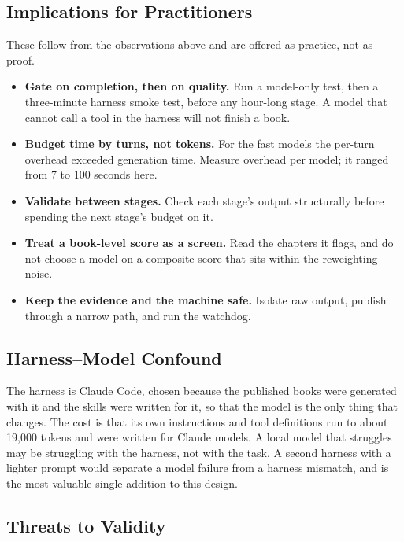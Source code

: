 \subsection{Implications for Practitioners}

These follow from the observations above and are offered as practice, not as proof.

\begin{itemize}
\item \textbf{Gate on completion, then on quality.} Run a model-only test, then a three-minute harness smoke test, before any hour-long stage. A model that cannot call a tool in the harness will not finish a book.
\item \textbf{Budget time by turns, not tokens.} For the fast models the per-turn overhead exceeded generation time. Measure overhead per model; it ranged from 7 to 100 seconds here.
\item \textbf{Validate between stages.} Check each stage's output structurally before spending the next stage's budget on it.
\item \textbf{Treat a book-level score as a screen.} Read the chapters it flags, and do not choose a model on a composite score that sits within the reweighting noise.
\item \textbf{Keep the evidence and the machine safe.} Isolate raw output, publish through a narrow path, and run the watchdog.
\end{itemize}

\subsection{Harness--Model Confound}

The harness is Claude Code, chosen because the published books were generated with it and the skills were written for it, so that the model is the only thing that changes. The cost is that its own instructions and tool definitions run to about 19,000 tokens and were written for Claude models. A local model that struggles may be struggling with the harness, not with the task. A second harness with a lighter prompt would separate a model failure from a harness mismatch, and is the most valuable single addition to this design.

\subsection{Threats to Validity}

